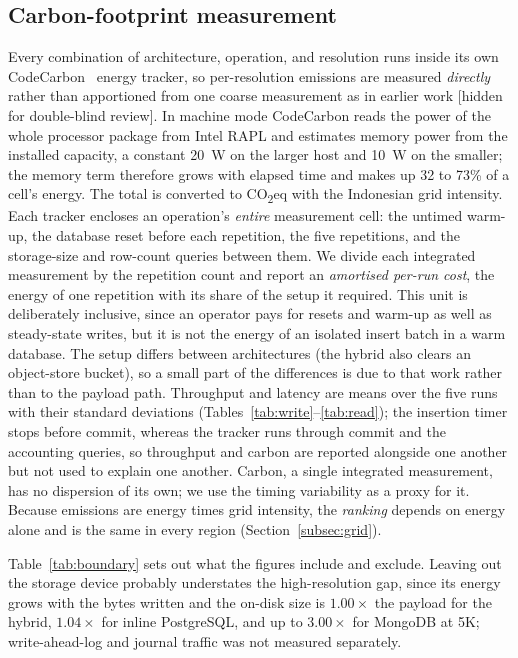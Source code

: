 \documentclass[pdflatex,sn-basic]{sn-jnl}%
\begin{document}
\subsection{Carbon-footprint measurement}\label{subsec:carbon_method}
Every combination of architecture, operation, and resolution runs inside its own CodeCarbon~\citep{codecarbon} energy tracker, so per-resolution emissions are measured \emph{directly} rather than apportioned from one coarse measurement as in earlier work [hidden for double-blind review]. In machine mode CodeCarbon reads the power of the whole processor package from Intel RAPL and estimates memory power from the installed capacity, a constant 20~W on the larger host and 10~W on the smaller; the memory term therefore grows with elapsed time and makes up 32 to 73\% of a cell's energy. The total is converted to CO\textsubscript{2}eq with the Indonesian grid intensity. Each tracker encloses an operation's \emph{entire} measurement cell: the untimed warm-up, the database reset before each repetition, the five repetitions, and the storage-size and row-count queries between them. We divide each integrated measurement by the repetition count and report an \emph{amortised per-run cost}, the energy of one repetition with its share of the setup it required. This unit is deliberately inclusive, since an operator pays for resets and warm-up as well as steady-state writes, but it is not the energy of an isolated insert batch in a warm database. The setup differs between architectures (the hybrid also clears an object-store bucket), so a small part of the differences is due to that work rather than to the payload path. Throughput and latency are means over the five runs with their standard deviations (Tables~\ref{tab:write}--\ref{tab:read}); the insertion timer stops before commit, whereas the tracker runs through commit and the accounting queries, so throughput and carbon are reported alongside one another but not used to explain one another. Carbon, a single integrated measurement, has no dispersion of its own; we use the timing variability as a proxy for it. Because emissions are energy times grid intensity, the \emph{ranking} depends on energy alone and is the same in every region (Section~\ref{subsec:grid}).

Table~\ref{tab:boundary} sets out what the figures include and exclude. Leaving out the storage device probably understates the high-resolution gap, since its energy grows with the bytes written and the on-disk size is $1.00\times$ the payload for the hybrid, $1.04\times$ for inline PostgreSQL, and up to $3.00\times$ for MongoDB at 5K; write-ahead-log and journal traffic was not measured separately.
\end{document}
